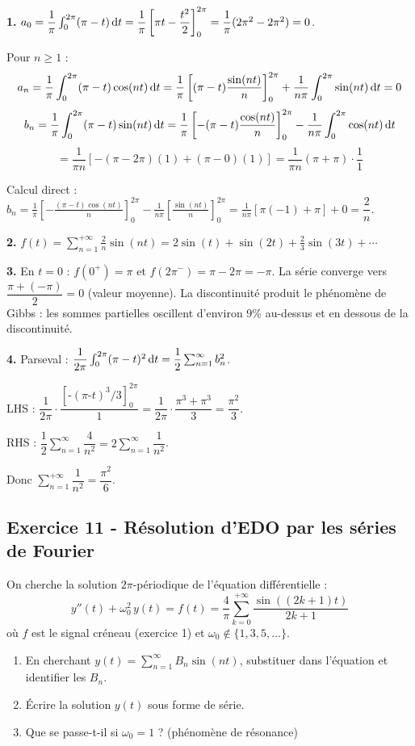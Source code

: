 \documentclass[12pt,a4paper]{article}
\begin{document}
\begin{boitecorrige}
\textbf{1.} $a_0 = \dfrac{1}{\pi}\int_0^{2\pi}(\pi-t)\,\mathrm{d} t = \dfrac{1}{\pi}\left[\pi t - \dfrac{t^2}{2}\right]_0^{2\pi} = \dfrac{1}{\pi}(2\pi^2 - 2\pi^2) = 0$.

Pour $n\geq1$ :
\[
a_n = \frac{1}{\pi}\int_0^{2\pi}(\pi-t)\cos(nt)\,\mathrm{d} t = \frac{1}{\pi}\left[(\pi-t)\frac{\sin(nt)}{n}\right]_0^{2\pi} + \frac{1}{n\pi}\int_0^{2\pi}\sin(nt)\,\mathrm{d} t = 0
\]
\[
b_n = \frac{1}{\pi}\int_0^{2\pi}(\pi-t)\sin(nt)\,\mathrm{d} t = \frac{1}{\pi}\left[-(\pi-t)\frac{\cos(nt)}{n}\right]_0^{2\pi} - \frac{1}{n\pi}\int_0^{2\pi}\cos(nt)\,\mathrm{d} t
\]
\[
= \frac{1}{\pi n}\left[-(\pi-2\pi)(1) + (\pi-0)(1)\right] = \frac{1}{\pi n}(\pi + \pi)\cdot\frac{1}{1}
\]

Calcul direct : $b_n = \frac{1}{\pi}\left[-\frac{(\pi-t)\cos(nt)}{n}\right]_0^{2\pi} - \frac{1}{n\pi}\left[\frac{\sin(nt)}{n}\right]_0^{2\pi} = \frac{1}{n\pi}\left[\pi(-1) + \pi \right] + 0 = \dfrac{2}{n}$.

\textbf{2.} $f(t) = \displaystyle\sum_{n=1}^{+\infty}\frac{2}{n}\sin(nt) = 2\sin(t) + \sin(2t) + \frac{2}{3}\sin(3t)+\cdots$

\textbf{3.} En $t = 0$ : $f(0^+) = \pi$ et $f(2\pi^-) = \pi - 2\pi = -\pi$. La série converge vers $\dfrac{\pi + (-\pi)}{2} = 0$ (valeur moyenne). La discontinuité produit le phénomène de Gibbs : les sommes partielles oscillent d'environ 9\% au-dessus et en dessous de la discontinuité.

\textbf{4.} Parseval : $\dfrac{1}{2\pi}\int_0^{2\pi}(\pi-t)^2\,\mathrm{d} t = \dfrac{1}{2}\sum_{n=1}^\infty b_n^2$.

LHS : $\dfrac{1}{2\pi}\cdot\dfrac{[\text{-}(\pi\text{-}t)^3/3]_0^{2\pi}}{1} = \dfrac{1}{2\pi}\cdot\dfrac{\pi^3+\pi^3}{3} = \dfrac{\pi^2}{3}$.

RHS : $\dfrac{1}{2}\sum_{n=1}^\infty\dfrac{4}{n^2} = 2\sum_{n=1}^\infty\dfrac{1}{n^2}$.

Donc $\displaystyle\sum_{n=1}^{+\infty}\dfrac{1}{n^2} = \dfrac{\pi^2}{6}$.
\end{boitecorrige}

\subsection*{Exercice 11 - Résolution d'EDO par les séries de Fourier \niveau{\difficile}}

\begin{boiteexercice}
On cherche la solution $2\pi$-périodique de l'équation différentielle :
\[
y''(t) + \omega_0^2\,y(t) = f(t) = \frac{4}{\pi}\sum_{k=0}^{+\infty}\frac{\sin((2k+1)t)}{2k+1}
\]
où $f$ est le signal créneau (exercice 1) et $\omega_0 \notin \{1,3,5,\ldots\}$.
\begin{enumerate}
  \item En cherchant $y(t) = \sum_{n=1}^\infty B_n\sin(nt)$, substituer dans l'équation et identifier les $B_n$.
  \item Écrire la solution $y(t)$ sous forme de série.
  \item Que se passe-t-il si $\omega_0 = 1$ ? (phénomène de résonance)
\end{enumerate}
\end{boiteexercice}
\end{document}
